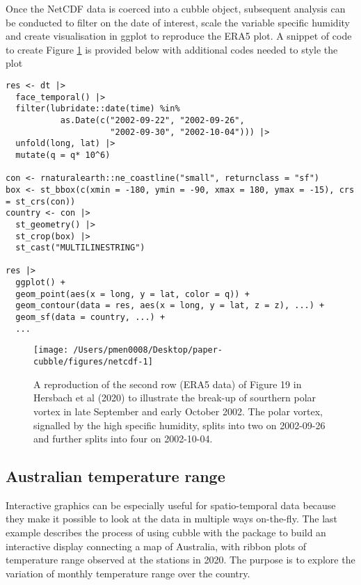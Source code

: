 \documentclass[
  shortnames]{jss}
\begin{document}
Once the NetCDF data is coerced into a cubble object, subsequent analysis can be conducted to filter on the date of interest, scale the variable specific humidity and create visualisation in ggplot to reproduce the ERA5 plot. A snippet of code to create Figure \ref{fig:netcdf} is provided below with additional codes needed to style the plot

\begin{verbatim}
res <- dt |> 
  face_temporal() |> 
  filter(lubridate::date(time) %in% 
           as.Date(c("2002-09-22", "2002-09-26",
                     "2002-09-30", "2002-10-04"))) |>
  unfold(long, lat) |> 
  mutate(q = q* 10^6)

con <- rnaturalearth::ne_coastline("small", returnclass = "sf")
box <- st_bbox(c(xmin = -180, ymin = -90, xmax = 180, ymax = -15), crs = st_crs(con)) 
country <- con |> 
  st_geometry() |> 
  st_crop(box) |> 
  st_cast("MULTILINESTRING")

res |> 
  ggplot() +
  geom_point(aes(x = long, y = lat, color = q)) + 
  geom_contour(data = res, aes(x = long, y = lat, z = z), ...) +
  geom_sf(data = country, ...) +
  ...
\end{verbatim}

\begin{CodeChunk}
\begin{figure}

{\centering \texttt{[image: /Users/pmen0008/Desktop/paper-cubble/figures/netcdf-1]} 

}

\caption[A reproduction of the second row (ERA5 data) of Figure 19 in Hersbach et al (2020) to illustrate the break-up of sourthern polar vortex in late September and early October 2002]{A reproduction of the second row (ERA5 data) of Figure 19 in Hersbach et al (2020) to illustrate the break-up of sourthern polar vortex in late September and early October 2002. The polar vortex, signalled by the high specific humidity, splits into two on 2002-09-26 and further splits into four on 2002-10-04.}\label{fig:netcdf}
\end{figure}
\end{CodeChunk}

\hypertarget{australian-temperature-range}{%
\subsection{Australian temperature range}\label{australian-temperature-range}}

Interactive graphics can be especially useful for spatio-temporal data because they make it possible to look at the data in multiple ways on-the-fly. The last example describes the process of using cubble with the  package to build an interactive display connecting a map of Australia, with ribbon plots of temperature range observed at the stations in 2020. The purpose is to explore the variation of monthly temperature range over the country.
\end{document}

